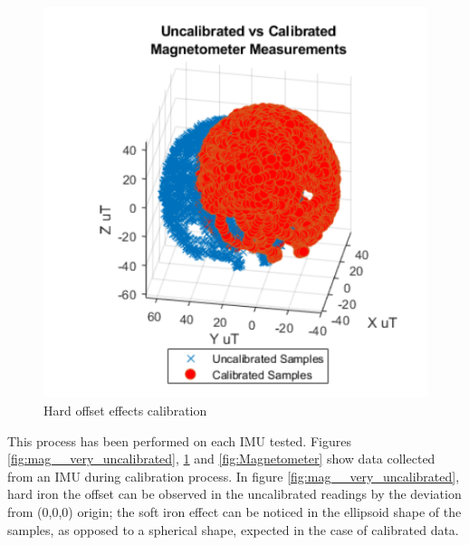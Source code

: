 \begin{figure}[H]
    \centering
    \includegraphics[scale=0.7]{graphics/mag0.png}
    \caption{Hard offset effects calibration}
     \label{fig:mag_uncalibrated}
\end{figure}
 
 
This process has been performed on each IMU tested. Figures \ref{fig:mag__very_uncalibrated}, \ref{fig:mag_uncalibrated} and \ref{fig:Magnetometer} show data collected from an IMU during calibration process. In figure \ref{fig:mag__very_uncalibrated}, hard iron the offset can be observed in the uncalibrated readings by the deviation from (0,0,0) origin; the soft iron effect can be noticed in the ellipsoid shape of the samples, as opposed to a spherical shape, expected in the case of calibrated data. 

